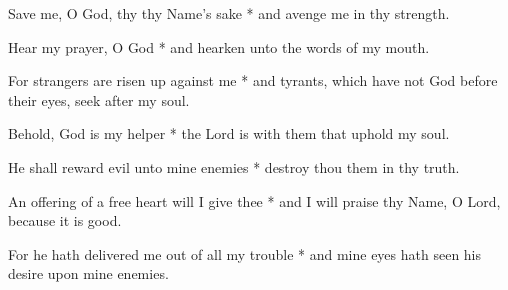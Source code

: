 Save me, O God, thy thy Name's sake * and avenge me in thy strength.

Hear my prayer, O God * and hearken unto the words of my mouth.

For strangers are risen up against me * and tyrants, which have not God before their eyes, seek after my soul.

Behold, God is my helper * the Lord is with them that uphold my soul.

He shall reward evil unto mine enemies * destroy thou them in thy truth.

An offering of a free heart will I give thee * and I will praise thy Name, O Lord, because it is good.

For he hath delivered me out of all my trouble * and mine eyes hath seen his desire upon mine enemies.